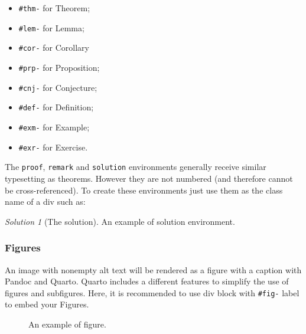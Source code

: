 \documentclass[
  journal,
]{IEEEtran}%
\providecommand{\tightlist}{%
  \setlength{\itemsep}{0pt}\setlength{\parskip}{0pt}}\usepackage{longtable,booktabs,array}
\theoremstyle{plain}
\theoremstyle{remark}
\newtheorem*{solution}{Solution}
\begin{document}
\begin{itemize}
\tightlist
\item
  \texttt{\#thm-} for Theorem;
\item
  \texttt{\#lem-} for Lemma;
\item
  \texttt{\#cor-} for Corollary
\item
  \texttt{\#prp-} for Proposition;
\item
  \texttt{\#cnj-} for Conjecture;
\item
  \texttt{\#def-} for Definition;
\item
  \texttt{\#exm-} for Example;
\item
  \texttt{\#exr-} for Exercise.
\end{itemize}

The \texttt{proof}, \texttt{remark} and \texttt{solution} environments
generally receive similar typesetting as theorems. However they are not
numbered (and therefore cannot be cross-referenced). To create these
environments just use them as the class name of a div such as:

\begin{solution}[The solution]
An example of solution environment.
\end{solution}

\subsubsection{Figures}\label{figures}

An image with nonempty alt text will be rendered as a figure with a
caption with Pandoc and Quarto. Quarto includes a different features to
simplify the use of figures and subfigures. Here, it is recommended to
use div block with \texttt{\#fig-} label to embed your Figures.

\begin{figure}


\caption{\label{fig-1}An example of figure.}

\end{figure}%
\end{document}
